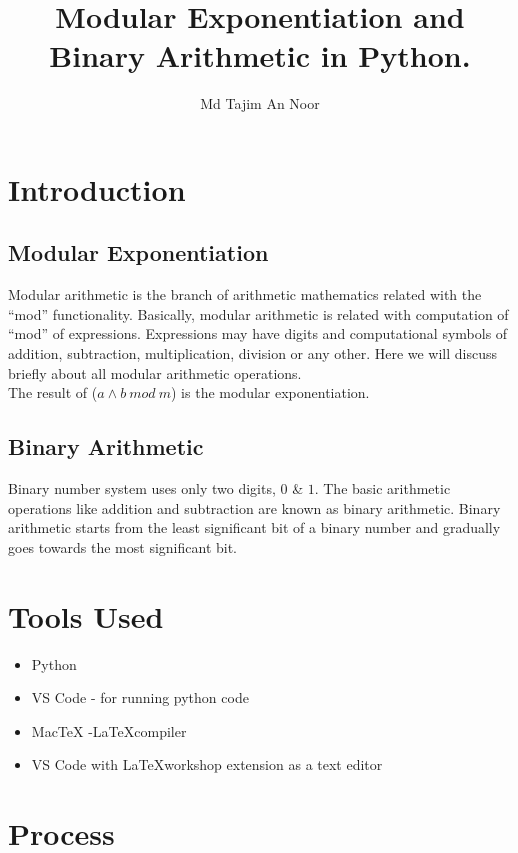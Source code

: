 \documentclass[12pt]{article}
\title{Modular Exponentiation and Binary Arithmetic in Python.}
\author{Md Tajim An Noor}
\date{}
\begin{document}

\pagebreak

\tableofcontents

\maketitle
\section{Introduction}


\subsection{Modular Exponentiation}
Modular arithmetic is the branch of arithmetic mathematics related with the “mod” functionality. Basically, modular arithmetic is related with computation of “mod” of expressions. Expressions may have digits and computational symbols of addition, subtraction, multiplication, division or any other. Here we will discuss briefly about all modular arithmetic operations.\\
The result of ($a \wedge b \:mod\: m$) is the modular exponentiation.
\cite{gfgMod}

\subsection{Binary Arithmetic}
Binary number system uses only two digits, $0$ \& $1$. The basic arithmetic operations like addition and subtraction are known as binary arithmetic. Binary arithmetic starts from the least significant bit of a binary number and gradually goes towards the most significant bit.

\section{Tools Used}
\begin{itemize}
    \item Python
    \item VS Code - for running python code
    \item MacTeX -\LaTeX  compiler
    \item VS Code with \LaTeX workshop extension as a text editor
\end{itemize}

\section{Process}
\end{document}

